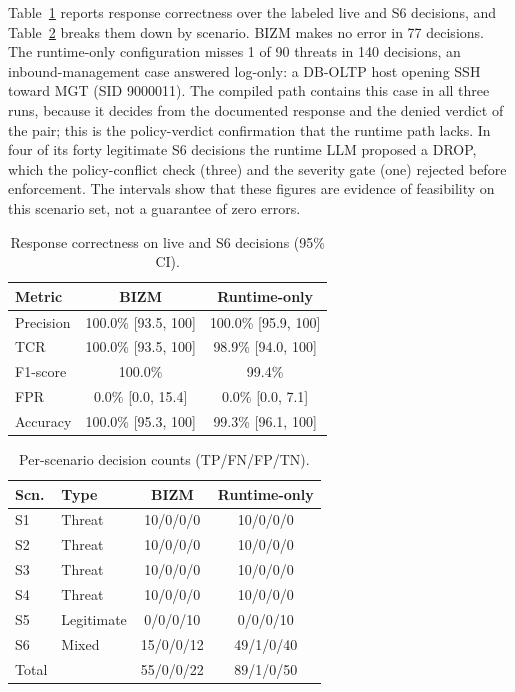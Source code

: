 \documentclass[final,5p]{elsarticle}
\begin{document}
Table~\ref{tab:confusion} reports response correctness over the labeled live and S6 decisions, and Table~\ref{tab:per_scenario} breaks them down by scenario. BIZM makes no error in 77 decisions. The runtime-only configuration misses 1 of 90 threats in 140 decisions, an inbound-management case answered log-only: a DB-OLTP host opening SSH toward MGT (SID 9000011). The compiled path contains this case in all three runs, because it decides from the documented response and the denied verdict of the pair; this is the policy-verdict confirmation that the runtime path lacks. In four of its forty legitimate S6 decisions the runtime LLM proposed a DROP, which the policy-conflict check (three) and the severity gate (one) rejected before enforcement. The intervals show that these figures are evidence of feasibility on this scenario set, not a guarantee of zero errors.

\begin{table}[t]
    \centering
    \caption{Response correctness on live and S6 decisions (95\% CI).}
    \label{tab:confusion}
    \small
    \setlength{\tabcolsep}{4pt}
    \begin{tabular}{@{}lcc@{}}
        \toprule
        \textbf{Metric} & \textbf{BIZM} & \textbf{Runtime-only} \\
        \midrule
        Precision & 100.0\% [93.5, 100] & 100.0\% [95.9, 100] \\
        TCR       & 100.0\% [93.5, 100] & 98.9\% [94.0, 100] \\
        F1-score  & 100.0\%             & 99.4\% \\
        FPR       & 0.0\% [0.0, 15.4]   & 0.0\% [0.0, 7.1] \\
        Accuracy  & 100.0\% [95.3, 100] & 99.3\% [96.1, 100] \\
        \bottomrule
    \end{tabular}
\end{table}

\begin{table}[t]
    \centering
    \caption{Per-scenario decision counts (TP/FN/FP/TN).}
    \label{tab:per_scenario}
    \small
    \setlength{\tabcolsep}{4pt}
    \begin{tabular}{@{}llcc@{}}
        \toprule
        \textbf{Scn.} & \textbf{Type} & \textbf{BIZM} & \textbf{Runtime-only} \\
        \midrule
        S1 & Threat     & 10/0/0/0  & 10/0/0/0  \\
        S2 & Threat     & 10/0/0/0  & 10/0/0/0  \\
        S3 & Threat     & 10/0/0/0  & 10/0/0/0  \\
        S4 & Threat     & 10/0/0/0  & 10/0/0/0  \\
        S5 & Legitimate & 0/0/0/10  & 0/0/0/10  \\
        S6 & Mixed      & 15/0/0/12 & 49/1/0/40 \\
        \midrule
        Total &         & 55/0/0/22 & 89/1/0/50 \\
        \bottomrule
    \end{tabular}
\end{table}
\end{document}
